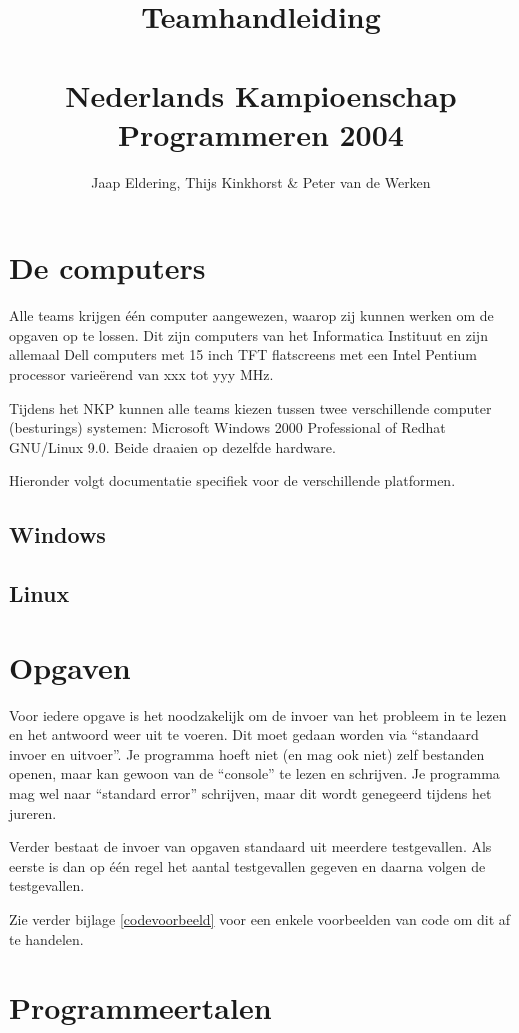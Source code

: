 \documentclass[11pt,titlepage,a4paper]{article}
\title{Teamhandleiding\\~\\Nederlands Kampioenschap Programmeren 2004}
\author{Jaap Eldering, Thijs Kinkhorst \& Peter van de Werken}
\begin{document}
\maketitle

\tableofcontents
\newpage


\section{De computers}

Alle teams krijgen \'e\'en computer aangewezen, waarop zij kunnen
werken om de opgaven op te lossen. Dit zijn computers van het
Informatica Instituut en zijn allemaal Dell computers met 15 inch TFT
flatscreens met een Intel Pentium processor varie\"erend van xxx tot
yyy MHz.

Tijdens het NKP kunnen alle teams kiezen tussen twee verschillende
computer (besturings) systemen: Microsoft Windows 2000 Professional of
Redhat GNU/Linux 9.0. Beide draaien op dezelfde hardware.

Hieronder volgt documentatie specifiek voor de verschillende platformen.

\subsection{Windows}
\subsection{Linux}


\section{Opgaven}

Voor iedere opgave is het noodzakelijk om de invoer van het probleem
in te lezen en het antwoord weer uit te voeren. Dit moet gedaan worden
via ``standaard invoer en uitvoer''. Je programma hoeft niet (en mag
ook niet) zelf bestanden openen, maar kan gewoon van de ``console'' te
lezen en schrijven. Je programma mag wel naar ``standard error''
schrijven, maar dit wordt genegeerd tijdens het jureren.

Verder bestaat de invoer van opgaven standaard uit meerdere
testgevallen. Als eerste is dan op \'e\'en regel het aantal
testgevallen gegeven en daarna volgen de testgevallen.

Zie verder bijlage \ref{codevoorbeeld} voor een enkele voorbeelden van
code om dit af te handelen.


\section{Programmeertalen}
\end{document}
